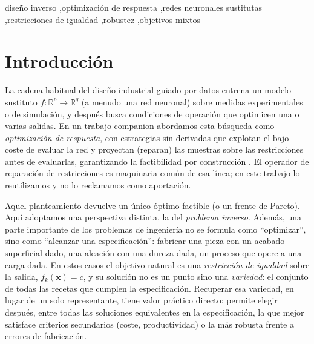 \documentclass[5p,times,authoryear]{elsarticle}
\begin{document}
\begin{frontmatter}
\begin{keyword}
diseño inverso \sep optimización de respuesta \sep redes neuronales sustitutas
\sep restricciones de igualdad \sep robustez \sep objetivos mixtos
\end{keyword}

\end{frontmatter}

\section{Introducción}
\label{sec:intro}

La cadena habitual del diseño industrial guiado por datos entrena un modelo
sustituto $f:\mathbb{R}^p\to\mathbb{R}^q$ (a menudo una red neuronal) sobre
medidas experimentales o de simulación, y después busca condiciones de operación
que optimicen una o varias salidas. En un trabajo companion abordamos esta búsqueda
como \emph{optimización de respuesta}, con estrategias sin derivadas que explotan el
bajo coste de evaluar la red y proyectan (reparan) las muestras sobre las
restricciones antes de evaluarlas, garantizando la factibilidad por construcción
\citep{scala2026idc}. El operador de reparación de restricciones es maquinaria común
de esa línea; en este trabajo lo reutilizamos y no lo reclamamos como aportación.

Aquel planteamiento devuelve un único óptimo factible (o un frente de Pareto). Aquí
adoptamos una perspectiva distinta, la del \emph{problema inverso}. Además, una
parte importante de los problemas de ingeniería no se formula como
``optimizar'', sino como ``alcanzar una especificación'': fabricar una pieza con
un acabado superficial dado, una aleación con una dureza dada, un proceso que
opere a una carga dada. En estos casos el objetivo natural es una
\emph{restricción de igualdad} sobre la salida, $f_k(\mathbf{x})=c$, y su
solución no es un punto sino una \emph{variedad}: el conjunto de todas las
recetas que cumplen la especificación. Recuperar esa variedad, en lugar de un
solo representante, tiene valor práctico directo: permite elegir después, entre
todas las soluciones equivalentes en la especificación, la que mejor satisface
criterios secundarios (coste, productividad) o la más robusta frente a errores
de fabricación.
\end{document}
